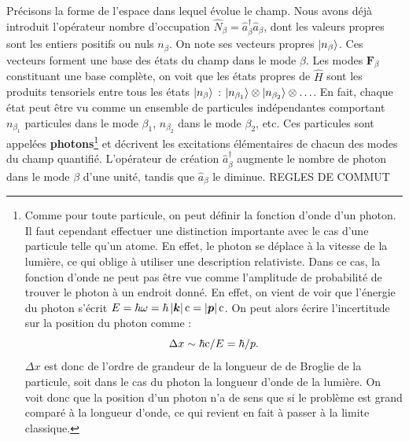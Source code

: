 Précisons la forme de l'espace dans lequel évolue le champ. Nous avons déjà introduit l'opérateur nombre d'occupation $\hat{N}_{\beta}=\hat{a}^{\dag}_{\beta}\hat{a}_{\beta}$, dont les valeurs propres sont les entiers positifs ou nuls $n_{\beta}$. On note ses vecteurs propres $\ket{n_{\beta}}$. Ces vecteurs forment une base des états du champ dans le mode ${\beta}$. Les modes $\bm{F}_{\beta}$ constituant une base complète, on voit que les états propres de $\hat{H}$ sont les produits tensoriels entre tous les états $\ket{n_{\beta}}$ : $\ket{n_{\beta_1}}\otimes\ket{n_{\beta_2}}\otimes\ldots$. En fait, chaque état peut être vu comme un ensemble de particules indépendantes comportant $n_{\beta_1}$ particules dans le mode ${\beta_1}$, $n_{\beta_2}$ dans le mode ${\beta_2}$, etc. Ces particules sont appelées \textbf{photons}\footnote{Comme pour toute particule, on peut définir la fonction d'onde d'un photon. Il faut cependant effectuer une distinction importante avec le cas d'une particule telle qu'un atome. En effet, le photon se déplace à la vitesse de la lumière, ce qui oblige à utiliser une description relativiste. Dans ce cas, la fonction d'onde ne peut pas être vue comme l'amplitude de probabilité de trouver le photon à un endroit donné. En effet, on vient de voir que l'énergie du photon s'écrit $E = \hbar\omega = \hbar\left|\bm{k}\right|\mathrm{c}=\left|\bm{p}\right|\mathrm{c}$. On peut alors écrire l'incertitude sur la position du photon comme :
\begin{equation}
\Delta x \sim \hbar\mathrm{c}/E = \hbar/p.
\end{equation}
$\Delta x$ est donc de l'ordre de grandeur de la longueur de de Broglie de la particule, soit dans le cas du photon la longueur d'onde de la lumière. On voit donc que la position d'un photon n'a de sens que si le problème est grand comparé à la longueur d'onde, ce qui revient en fait à passer à la limite classique.} et décrivent les excitations élémentaires de chacun des modes du champ quantifié. L'opérateur de création $\hat{a}^{\dag}_{\beta}$ augmente le nombre de photon dans le mode ${\beta}$ d'une unité, tandis que $\hat{a}_{\beta}$ le diminue. \textcolor[rgb]{1,0,0}{REGLES DE COMMUT}

